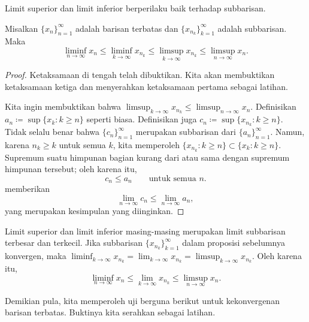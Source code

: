Limit superior dan limit inferior berperilaku baik
terhadap subbarisan.

\begin{prop} \label{prop:subseqslimsupinf}
Misalkan $\{ x_n \}_{n=1}^\infty$ adalah barisan terbatas dan
$\{ x_{n_k} \}_{k=1}^\infty$ adalah subbarisan.  Maka
\begin{equation*}
\liminf_{n\to\infty} x_n \leq
\liminf_{k\to\infty} x_{n_k} \leq
\limsup_{k\to\infty} x_{n_k} \leq
\limsup_{n\to\infty} x_n .
\end{equation*}
\end{prop}

\begin{proof}
Ketaksamaan di tengah telah dibuktikan.  Kita akan membuktikan ketaksamaan
ketiga dan menyerahkan ketaksamaan pertama sebagai latihan.

Kita ingin membuktikan bahwa
$\limsup_{k\to\infty} x_{n_k} \leq \limsup_{n\to\infty} x_n$.  Definisikan
$a_n \coloneqq \sup \{ x_k : k \geq n \}$ 
seperti biasa.
Definisikan juga
$c_n \coloneqq \sup \{ x_{n_k} : k \geq n \}$.
Tidak selalu benar bahwa $\{ c_n \}_{n=1}^\infty$ merupakan subbarisan
dari $\{ a_n \}_{n=1}^\infty$.
Namun, karena $n_k \geq k$ untuk semua $k$, kita memperoleh
$\{ x_{n_k} : k \geq n \} \subset \{ x_k : k \geq n \}$.
Supremum suatu himpunan bagian kurang dari atau sama dengan supremum
himpunan tersebut; oleh karena itu,
\begin{equation*}
c_n \leq a_n \qquad \text{untuk semua $n$}.
\end{equation*}
 memberikan
\begin{equation*}
\lim_{n\to\infty} c_n \leq \lim_{n\to\infty} a_n ,
\end{equation*}
yang merupakan kesimpulan yang diinginkan.
\end{proof}

Limit superior dan limit inferior
masing-masing merupakan limit subbarisan terbesar dan terkecil.
Jika subbarisan $\{ x_{n_k} \}_{k=1}^\infty$ dalam proposisi sebelumnya
konvergen, maka
$\liminf_{k\to\infty} x_{n_k} = \lim_{k\to\infty} x_{n_k} =
\limsup_{k\to\infty} x_{n_k}$.  Oleh karena itu,
\begin{equation*}
\liminf_{n\to\infty} x_n \leq
\lim_{k\to\infty} x_{n_k} \leq
\limsup_{n\to\infty} x_n .
\end{equation*}

Demikian pula, kita memperoleh uji berguna berikut untuk kekonvergenan
barisan terbatas.  Buktinya kita serahkan sebagai latihan.

